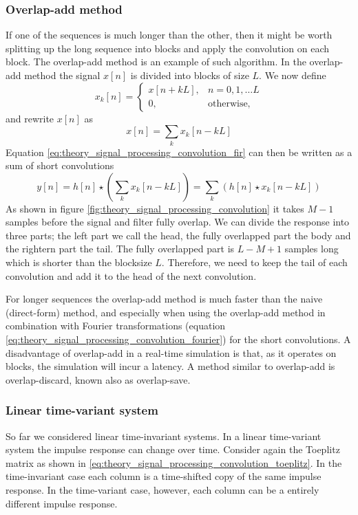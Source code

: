 \subsubsection{Overlap-add method}
If one of the sequences is much longer than the other, then it might be worth
splitting up the long sequence into blocks and apply the convolution on each
block. The overlap-add method is an example of such algorithm. In the
overlap-add method the signal $x[n]$ is divided into blocks of size $L$. We now
define
\begin{equation}
 x_k[n] =
 \begin{cases}
  x[n+kL], & n = 0,1,\dots L \\
  0, & \text{otherwise,}
 \end{cases}
\end{equation}
and rewrite $x[n]$ as
\begin{equation}
 x[n] = \sum_k x_k[n-kL]
\end{equation}
Equation \eqref{eq:theory_signal_processing_convolution_fir} can then be written as a sum of short convolutions
\begin{equation}
y[n] = h[n] \star \left( \sum_k x_k[n-kL] \right) = \sum_k \left( h[n] \star x_k[n-kL] \right)
\end{equation}
As shown in figure \ref{fig:theory_signal_processing_convolution} it takes $M-1$
samples before the signal and filter fully overlap. We can divide the response
into three parts; the left part we call the head, the fully overlapped part the
body and the rightern part the tail. The fully overlapped part is $L-M+1$
samples long which is shorter than the blocksize $L$. Therefore, we need to keep
the tail of each convolution and add it to the head of the next convolution.

For longer sequences the overlap-add method is much faster than the naive
(direct-form) method, and especially when using the overlap-add method in
combination with Fourier transformations (equation
\eqref{eq:theory_signal_processing_convolution_fourier}) for the short
convolutions. A disadvantage of overlap-add in a real-time simulation is that,
as it operates on blocks, the simulation will incur a latency.
A method similar to overlap-add is overlap-discard, known also as overlap-save.

\subsubsection{Linear time-variant system}
So far we considered linear time-invariant systems. In a linear time-variant
system the impulse response can change over time. Consider again the Toeplitz
matrix as shown in \eqref{eq:theory_signal_processing_convolution_toeplitz}. In
the time-invariant case each column is a time-shifted copy of the same impulse
response. In the time-variant case, however, each column can be a entirely
different impulse response.

